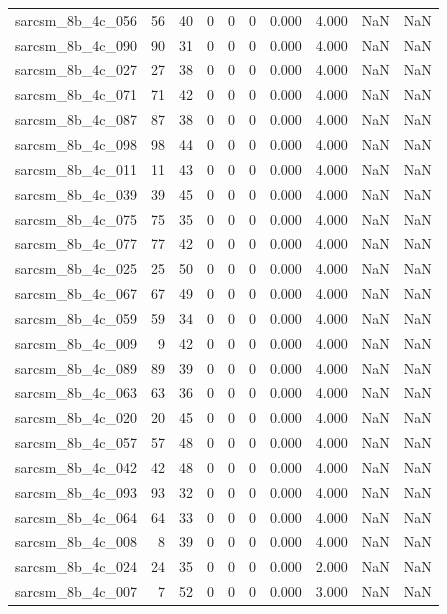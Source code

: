 \documentclass{article}
\begin{document}
\begin{longtable}{lrrrrrrrrr}
sarcsm\_8b\_4c\_056 & 56 & 40 & 0 & 0 & 0 & 0.000 & 4.000 & NaN & NaN \\
sarcsm\_8b\_4c\_090 & 90 & 31 & 0 & 0 & 0 & 0.000 & 4.000 & NaN & NaN \\
sarcsm\_8b\_4c\_027 & 27 & 38 & 0 & 0 & 0 & 0.000 & 4.000 & NaN & NaN \\
sarcsm\_8b\_4c\_071 & 71 & 42 & 0 & 0 & 0 & 0.000 & 4.000 & NaN & NaN \\
sarcsm\_8b\_4c\_087 & 87 & 38 & 0 & 0 & 0 & 0.000 & 4.000 & NaN & NaN \\
sarcsm\_8b\_4c\_098 & 98 & 44 & 0 & 0 & 0 & 0.000 & 4.000 & NaN & NaN \\
sarcsm\_8b\_4c\_011 & 11 & 43 & 0 & 0 & 0 & 0.000 & 4.000 & NaN & NaN \\
sarcsm\_8b\_4c\_039 & 39 & 45 & 0 & 0 & 0 & 0.000 & 4.000 & NaN & NaN \\
sarcsm\_8b\_4c\_075 & 75 & 35 & 0 & 0 & 0 & 0.000 & 4.000 & NaN & NaN \\
sarcsm\_8b\_4c\_077 & 77 & 42 & 0 & 0 & 0 & 0.000 & 4.000 & NaN & NaN \\
sarcsm\_8b\_4c\_025 & 25 & 50 & 0 & 0 & 0 & 0.000 & 4.000 & NaN & NaN \\
sarcsm\_8b\_4c\_067 & 67 & 49 & 0 & 0 & 0 & 0.000 & 4.000 & NaN & NaN \\
sarcsm\_8b\_4c\_059 & 59 & 34 & 0 & 0 & 0 & 0.000 & 4.000 & NaN & NaN \\
sarcsm\_8b\_4c\_009 & 9 & 42 & 0 & 0 & 0 & 0.000 & 4.000 & NaN & NaN \\
sarcsm\_8b\_4c\_089 & 89 & 39 & 0 & 0 & 0 & 0.000 & 4.000 & NaN & NaN \\
sarcsm\_8b\_4c\_063 & 63 & 36 & 0 & 0 & 0 & 0.000 & 4.000 & NaN & NaN \\
sarcsm\_8b\_4c\_020 & 20 & 45 & 0 & 0 & 0 & 0.000 & 4.000 & NaN & NaN \\
sarcsm\_8b\_4c\_057 & 57 & 48 & 0 & 0 & 0 & 0.000 & 4.000 & NaN & NaN \\
sarcsm\_8b\_4c\_042 & 42 & 48 & 0 & 0 & 0 & 0.000 & 4.000 & NaN & NaN \\
sarcsm\_8b\_4c\_093 & 93 & 32 & 0 & 0 & 0 & 0.000 & 4.000 & NaN & NaN \\
sarcsm\_8b\_4c\_064 & 64 & 33 & 0 & 0 & 0 & 0.000 & 4.000 & NaN & NaN \\
sarcsm\_8b\_4c\_008 & 8 & 39 & 0 & 0 & 0 & 0.000 & 4.000 & NaN & NaN \\
sarcsm\_8b\_4c\_024 & 24 & 35 & 0 & 0 & 0 & 0.000 & 2.000 & NaN & NaN \\
sarcsm\_8b\_4c\_007 & 7 & 52 & 0 & 0 & 0 & 0.000 & 3.000 & NaN & NaN \\

\end{longtable}
\end{document}
